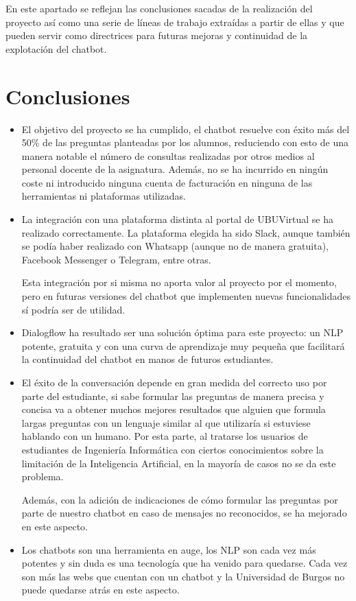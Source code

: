 
En este apartado se reflejan las conclusiones sacadas de la realización del proyecto así como una serie de líneas de trabajo extraídas a partir de ellas y que pueden servir como directrices para futuras mejoras y continuidad de la explotación del chatbot.

\section{Conclusiones}
\begin{itemize}
	\tightlist
	\item
	El objetivo del proyecto se ha cumplido, el chatbot resuelve con éxito más del 50\% de las preguntas planteadas por los alumnos, reduciendo con esto de una manera notable el número de consultas realizadas por otros medios al personal docente de la asignatura.
	Además, no se ha incurrido en ningún coste ni introducido ninguna cuenta de facturación en ninguna de las herramientas ni plataformas utilizadas.
	\newline
	\item
	La integración con una plataforma distinta al portal de UBUVirtual se ha realizado correctamente. La plataforma elegida ha sido Slack, aunque también se podía haber realizado con Whatsapp (aunque no de manera gratuita), Facebook Messenger o Telegram, entre otras. 
	
	Esta integración por si misma no aporta valor al proyecto por el momento, pero en futuras versiones del chatbot que implementen nuevas funcionalidades sí podría ser de utilidad.
	\newline
	\item
	Dialogflow ha resultado ser una solución óptima para este proyecto: un NLP potente, gratuita y con una curva de aprendizaje muy pequeña que facilitará la continuidad del chatbot en manos de futuros estudiantes.
	\newline
	\item
	El éxito de la conversación depende en gran medida del correcto uso por parte del estudiante, si sabe formular las preguntas de manera precisa y concisa va a obtener muchos mejores resultados que alguien que formula largas preguntas con un lenguaje similar al que utilizaría si estuviese hablando con un humano. Por esta parte, al tratarse los usuarios de estudiantes de Ingeniería Informática con ciertos conocimientos sobre la limitación de la Inteligencia Artificial, en la mayoría de casos no se da este problema. 
	 
	Además, con la adición de indicaciones de cómo formular las preguntas por parte de nuestro chatbot en caso de mensajes no reconocidos, se ha mejorado en este aspecto.
	\newline
	\item
	Los chatbots son una herramienta en auge, los NLP son cada vez más potentes y sin duda es una tecnología que ha venido para quedarse. Cada vez son más las webs que cuentan con un chatbot y la Universidad de Burgos no puede quedarse atrás en este aspecto. 
	
\end{itemize}

